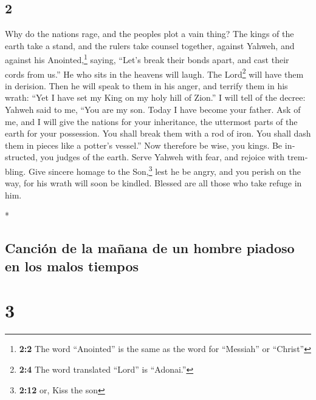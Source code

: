 \begin{paracol}{2}
\switchcolumn
\begin{otherlanguage}{english}

\hypertarget{section-3}{%
\section{2}\label{section-3}}

 Why do the nations rage, and the peoples plot a vain
thing?  The kings of the earth take a stand, and the
rulers take counsel together, against Yahweh, and against his
Anointed,\footnote{\textbf{2:2} The word ``Anointed'' is the same as the
  word for ``Messiah'' or ``Christ''} saying,  ``Let's
break their bonds apart, and cast their cords from us.'' 
He who sits in the heavens will laugh. The Lord\footnote{\textbf{2:4}
  The word translated ``Lord'' is ``Adonai.''} will have them in
derision.  Then he will speak to them in his anger, and
terrify them in his wrath:  ``Yet I have set my King on my
holy hill of Zion.''  I will tell of the decree: Yahweh
said to me, ``You are my son. Today I have become your father.
 Ask of me, and I will give the nations for your
inheritance, the uttermost parts of the earth for your possession.
 You shall break them with a rod of iron. You shall dash
them in pieces like a potter's vessel.''  Now therefore
be wise, you kings. Be instructed, you judges of the earth.
 Serve Yahweh with fear, and rejoice with trembling.
 Give sincere homage to the Son,\footnote{\textbf{2:12}
  or, Kiss the son} lest he be angry, and you perish on the way, for his
wrath will soon be kindled. Blessed are all those who take refuge in
him.

\end{otherlanguage}

\switchcolumn[0]*

\hypertarget{canciuxf3n-de-la-mauxf1ana-de-un-hombre-piadoso-en-los-malos-tiempos}{%
\subsection{Canción de la mañana de un hombre piadoso en los malos
tiempos}\label{canciuxf3n-de-la-mauxf1ana-de-un-hombre-piadoso-en-los-malos-tiempos}}

\hypertarget{section-4}{%
\section{3}\label{section-4}}


\end{paracol}
